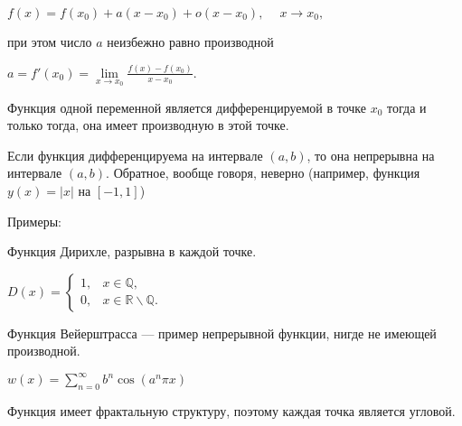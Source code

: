 $f(x)=f(x_0) + a(x-x_0) + o(x-x_0), \ \quad x \to x_0,
$

при этом число $a$ неизбежно равно производной 

$a = f'(x_0) = \lim \limits_{x\to x_0}\frac{f(x)-f(x_0)}{x-x_0}.$

Функция одной переменной является дифференцируемой в точке $x_0$ тогда и только тогда, она имеет производную в этой точке.

Если функция дифференцируема на интервале $(a,b)$, то она непрерывна на интервале $(a,b)$. Обратное, вообще говоря, неверно (например, функция $y(x)=|x|$ на $[-1,1]$)

Примеры: 

Функция Дирихле, разрывна в каждой точке.

$ D(x) = \begin{cases}1, &      x\in \mathbb Q, \\
 0, & x \in \mathbb R \backslash \mathbb Q. \end{cases} $
 
Функция Вейерштрасса — пример непрерывной функции, нигде не имеющей производной.

$ w(x)= \sum_{n=0}^\infty b^n \cos(a^n \pi x) $

Функция имеет фрактальную структуру, поэтому каждая точка является угловой.


